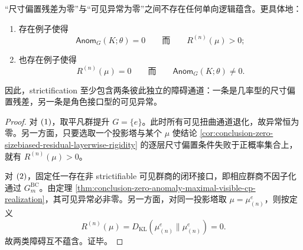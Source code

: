 
\begin{proposition}[尺寸偏置残差与可见异常的逻辑独立性]\label{prop:conclusion-sizebias-visible-anomaly-logical-independence}
“尺寸偏置残差为零”与“可见异常为零”之间不存在任何单向逻辑蕴含。更具体地：
\begin{enumerate}
  \item 存在例子使得
  \[
  \mathsf{Anom}_G(K;\theta)=0
  \qquad\text{而}\qquad
  R^{(n)}(\mu)>0;
  \]
  \item 也存在例子使得
  \[
  R^{(n)}(\mu)=0
  \qquad\text{而}\qquad
  \mathsf{Anom}_G(K;\theta)\neq 0.
  \]
\end{enumerate}
因此，strictification 至少包含两条彼此独立的障碍通道：一条是几率型的尺寸偏置残差，另一条是角色接口型的可见异常。
\end{proposition}
\begin{proof}
对 \(\textup{(1)}\)，取平凡群提升 \(G=\{e\}\)。此时所有可见扭曲通道退化，故异常恒为零。另一方面，只要选取一个投影塔与某个 \(\mu\) 使结论 \ref{cor:conclusion-zero-sizebiased-residual-layerwise-rigidity} 的逐层尺寸偏置条件失败于正概率集合上，就有 \(R^{(n)}(\mu)>0\)。

对 \(\textup{(2)}\)，固定任一存在非 strictifiable 可见群商的闭环接口，即相应群商不因子化通过 \(G_m^{\mathrm{BC}}\)。由定理 \ref{thm:conclusion-zero-anomaly-maximal-visible-cp-realization}，其可见异常必非零。另一方面，对同一投影塔取 \(\mu=\mu_{(n)}^{e}\)，则按定义
\[
R^{(n)}(\mu)=D_{\mathrm{KL}}(\mu_{(n)}^{e}\|\mu_{(n)}^{e})=0.
\]
故两类障碍互不蕴含。证毕。
\end{proof}

